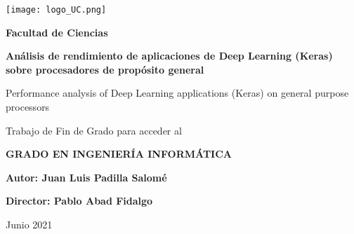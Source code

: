 
\begin{titlepage}
    \begin{center}
        \vspace*{1cm}
 
        \texttt{[image: logo\_UC.png]}

        \vspace{1.0cm}

        \Large
        \textbf{Facultad de Ciencias}

        \vspace{1.0cm}

        \LARGE
        \textbf{An\'alisis de rendimiento de aplicaciones de Deep Learning (Keras) sobre procesadores de prop\'osito general}
 
        \vspace{0.3cm}

        \Large
        Performance analysis of Deep Learning applications (Keras) on general purpose processors

        \vspace{1.5cm}

        \large
        Trabajo de Fin de Grado para acceder al

        \vspace{0.8cm}

        \Large
        \textbf{GRADO EN INGENIERÍA INFORMÁTICA}
 
        \vfill

        \large
        \begin{flushright}
            \textbf{Autor: Juan Luis Padilla Salomé}

            \vspace{0.4cm}

            \textbf{Director: Pablo Abad Fidalgo}

            \vspace{0.6cm}

            Junio 2021
        \end{flushright}
             
    \end{center}
 \end{titlepage}
